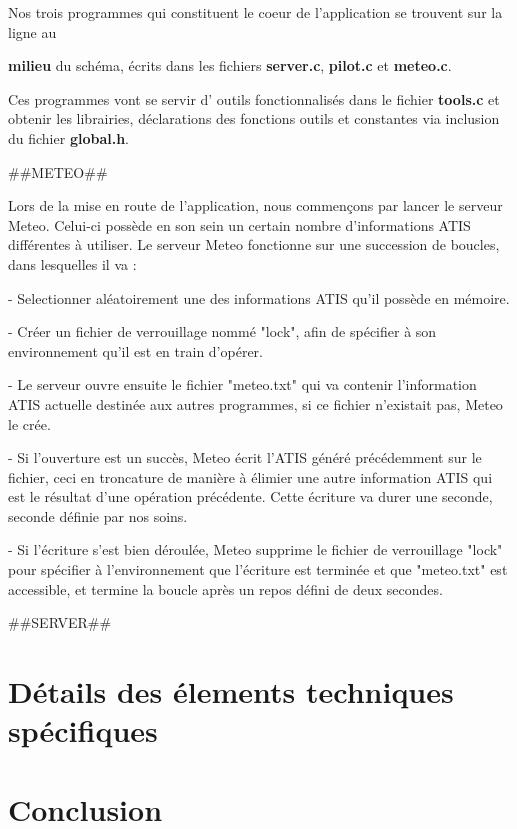 \documentclass{report}
\begin{document}
	Nos trois programmes qui constituent le coeur de l'application se trouvent sur la ligne au {\textbf{milieu} du schéma, écrits dans les fichiers {\textbf{\color{red} server.c}}, {\textbf{\color{red} pilot.c}} et {\textbf{\color{red} meteo.c}}.

	Ces programmes vont se servir d' \og outils \fg fonctionnalisés dans le fichier {\textbf{\color{red} tools.c}} et obtenir les librairies, déclarations des fonctions outils et constantes via inclusion du fichier {\textbf{\color{black} global.h}}.

	##METEO##

	Lors de la mise en route de l'application, nous commençons par lancer le serveur Meteo.
	Celui-ci possède en son sein un certain nombre d'informations ATIS différentes à utiliser.
	Le serveur Meteo fonctionne sur une succession de boucles, dans lesquelles il va :

	- Selectionner aléatoirement une des informations ATIS qu'il possède en mémoire.

	- Créer un fichier de verrouillage nommé "lock", afin de spécifier à son environnement qu'il est en train d'opérer.

	- Le serveur ouvre ensuite le fichier "meteo.txt" qui va contenir l'information ATIS actuelle destinée aux autres programmes, si ce fichier n'existait pas, Meteo le crée.

	- Si l'ouverture est un succès, Meteo écrit l'ATIS généré précédemment sur le fichier, ceci en troncature de manière à élimier une autre information ATIS qui est le résultat d'une opération précédente. Cette écriture va durer une seconde, seconde définie par nos soins.

	- Si l'écriture s'est bien déroulée, Meteo supprime le fichier de verrouillage "lock" pour spécifier à l'environnement que l'écriture est terminée et que "meteo.txt" est accessible, et termine la boucle après un repos défini de deux secondes.

	##SERVER##

	
\chapter{Détails des élements techniques spécifiques}
\chapter{Conclusion}

\begin{appendices}


\end{appendices}}
\end{document}
